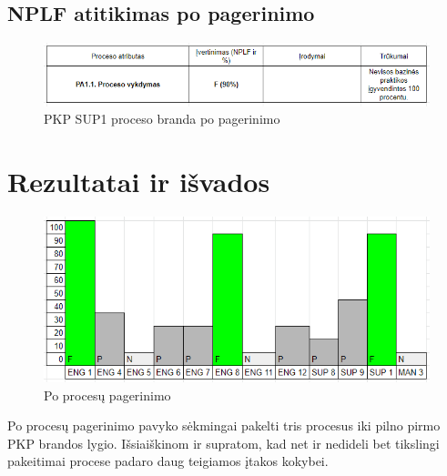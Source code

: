 \documentclass{VUMIFPSkursinis}
\begin{document}
	\subsection{NPLF atitikimas po pagerinimo}

	\begin{figure}[htbp]
		\includegraphics[scale=0.9]{img/sup1three}
		\caption{PKP SUP1 proceso branda po pagerinimo} %
		\label{img:pkpPries}
	\end{figure}	

\section{Rezultatai ir išvados}
	\begin{figure}[htbp]
		\includegraphics[scale=1]{img/ProcPo}
		\caption{Po procesų pagerinimo} %
		\label{img:pkpPries}
	\end{figure}

	Po procesų pagerinimo pavyko sėkmingai pakelti tris procesus iki pilno pirmo PKP brandos lygio. 
	Išsiaiškinom ir supratom, kad net ir nedideli bet tikslingi pakeitimai procese padaro daug teigiamos įtakos kokybei. 
\end{document}
